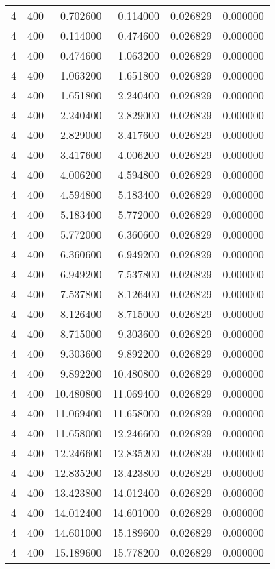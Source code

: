 \begin{longtable}{rrrrrr}
4 & 400 & 0.702600 & 0.114000 & 0.026829 & 0.000000 \\
4 & 400 & 0.114000 & 0.474600 & 0.026829 & 0.000000 \\
4 & 400 & 0.474600 & 1.063200 & 0.026829 & 0.000000 \\
4 & 400 & 1.063200 & 1.651800 & 0.026829 & 0.000000 \\
4 & 400 & 1.651800 & 2.240400 & 0.026829 & 0.000000 \\
4 & 400 & 2.240400 & 2.829000 & 0.026829 & 0.000000 \\
4 & 400 & 2.829000 & 3.417600 & 0.026829 & 0.000000 \\
4 & 400 & 3.417600 & 4.006200 & 0.026829 & 0.000000 \\
4 & 400 & 4.006200 & 4.594800 & 0.026829 & 0.000000 \\
4 & 400 & 4.594800 & 5.183400 & 0.026829 & 0.000000 \\
4 & 400 & 5.183400 & 5.772000 & 0.026829 & 0.000000 \\
4 & 400 & 5.772000 & 6.360600 & 0.026829 & 0.000000 \\
4 & 400 & 6.360600 & 6.949200 & 0.026829 & 0.000000 \\
4 & 400 & 6.949200 & 7.537800 & 0.026829 & 0.000000 \\
4 & 400 & 7.537800 & 8.126400 & 0.026829 & 0.000000 \\
4 & 400 & 8.126400 & 8.715000 & 0.026829 & 0.000000 \\
4 & 400 & 8.715000 & 9.303600 & 0.026829 & 0.000000 \\
4 & 400 & 9.303600 & 9.892200 & 0.026829 & 0.000000 \\
4 & 400 & 9.892200 & 10.480800 & 0.026829 & 0.000000 \\
4 & 400 & 10.480800 & 11.069400 & 0.026829 & 0.000000 \\
4 & 400 & 11.069400 & 11.658000 & 0.026829 & 0.000000 \\
4 & 400 & 11.658000 & 12.246600 & 0.026829 & 0.000000 \\
4 & 400 & 12.246600 & 12.835200 & 0.026829 & 0.000000 \\
4 & 400 & 12.835200 & 13.423800 & 0.026829 & 0.000000 \\
4 & 400 & 13.423800 & 14.012400 & 0.026829 & 0.000000 \\
4 & 400 & 14.012400 & 14.601000 & 0.026829 & 0.000000 \\
4 & 400 & 14.601000 & 15.189600 & 0.026829 & 0.000000 \\
4 & 400 & 15.189600 & 15.778200 & 0.026829 & 0.000000 \\

\end{longtable}
